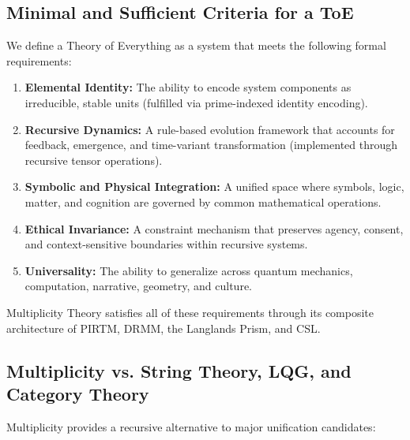 \documentclass{article}
\theoremstyle{plain}
\begin{document}
\subsection{Minimal and Sufficient Criteria for a ToE}

We define a Theory of Everything as a system that meets the following formal requirements:

\begin{enumerate}
    \item \textbf{Elemental Identity:} The ability to encode system components as irreducible, stable units (fulfilled via prime-indexed identity encoding).
    \item \textbf{Recursive Dynamics:} A rule-based evolution framework that accounts for feedback, emergence, and time-variant transformation (implemented through recursive tensor operations).
    \item \textbf{Symbolic and Physical Integration:} A unified space where symbols, logic, matter, and cognition are governed by common mathematical operations.
    \item \textbf{Ethical Invariance:} A constraint mechanism that preserves agency, consent, and context-sensitive boundaries within recursive systems.
    \item \textbf{Universality:} The ability to generalize across quantum mechanics, computation, narrative, geometry, and culture.
\end{enumerate}

Multiplicity Theory satisfies all of these requirements through its composite architecture of PIRTM, DRMM, the Langlands Prism, and CSL.

\subsection{Multiplicity vs. String Theory, LQG, and Category Theory}

Multiplicity provides a recursive alternative to major unification candidates:
\end{document}
